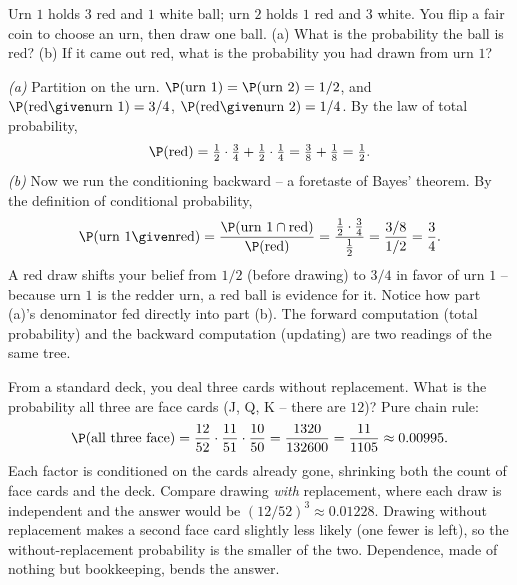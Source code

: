 \begin{example}
\label{ch04:ex-urn}
Urn $1$ holds $3$ red and $1$ white ball; urn $2$ holds $1$ red and $3$ white. You flip a fair coin to choose an urn, then draw one ball. (a) What is the probability the ball is red? (b) If it came out red, what is the probability you had drawn from urn $1$?

\emph{(a)} Partition on the urn. $\P(\text{urn }1) = \P(\text{urn }2) = 1/2$, and $\P(\text{red}\given \text{urn }1) = 3/4$, $\P(\text{red}\given \text{urn }2) = 1/4$. By the law of total probability,
\[
\P(\text{red}) = \tfrac12\cdot\tfrac34 + \tfrac12\cdot\tfrac14 = \tfrac38 + \tfrac18 = \tfrac12.
\]
\emph{(b)} Now we run the conditioning backward -- a foretaste of Bayes' theorem. By the definition of conditional probability,
\[
\P(\text{urn }1\given \text{red}) = \frac{\P(\text{urn }1 \cap \text{red})}{\P(\text{red})}
= \frac{\tfrac12\cdot\tfrac34}{\tfrac12} = \frac{3/8}{1/2} = \frac34.
\]
A red draw shifts your belief from $1/2$ (before drawing) to $3/4$ in favor of urn $1$ -- because urn $1$ is the redder urn, a red ball is evidence for it. Notice how part (a)'s denominator fed directly into part (b). The forward computation (total probability) and the backward computation (updating) are two readings of the same tree.
\end{example}

\begin{example}
\label{ch04:ex-three-face}
From a standard deck, you deal three cards without replacement. What is the probability all three are face cards (J, Q, K -- there are $12$)? Pure chain rule:
\[
\P(\text{all three face}) = \frac{12}{52}\cdot\frac{11}{51}\cdot\frac{10}{50}
= \frac{1320}{132600} = \frac{11}{1105}\approx 0.00995.
\]
Each factor is conditioned on the cards already gone, shrinking both the count of face cards and the deck. Compare drawing \emph{with} replacement, where each draw is independent and the answer would be $(12/52)^3 \approx 0.01228$. Drawing without replacement makes a second face card slightly less likely (one fewer is left), so the without-replacement probability is the smaller of the two. Dependence, made of nothing but bookkeeping, bends the answer.
\end{example}

